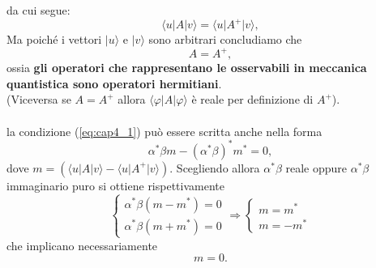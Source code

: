 da cui segue:
\begin{equation}
\langle u \vert A \vert v \rangle = \langle u \vert A^{+} \vert v \rangle ,
\end{equation}
Ma poiché i vettori $\vert u \rangle$ e $\vert v \rangle$ sono arbitrari concludiamo che
\begin{equation}
A= A^{+},
\end{equation}
ossia \textbf{gli operatori che rappresentano le osservabili in meccanica quantistica sono operatori hermitiani}.\\
(Viceversa se $A= A^{+}$ allora $\langle \varphi \vert A \vert \varphi \rangle$ è reale per definizione di $A^{+}$).\\ \\
la condizione (\ref{eq:cap4_1}) può essere scritta anche nella forma
\begin{equation}
\alpha ^* \beta m - \left( \alpha ^*  \beta \right) ^* m^* =0, 
\end{equation}
dove $m= \left( \langle u \vert A \vert v \rangle - \langle u \vert A^{+} \vert v \rangle \right)$. Scegliendo allora $\alpha ^* \beta$ reale oppure $\alpha ^* \beta$ immaginario puro si ottiene rispettivamente
\begin{equation}
\begin{cases}
\alpha ^* \beta \left( m- m^* \right) =0 \\
\alpha ^* \beta \left( m + m^* \right) =0
\end{cases}
\Rightarrow
\begin{cases}
m= m^*\\
m= - m^*
\end{cases}
\end{equation}
che implicano necessariamente
\begin{equation}
m=0.
\end{equation}
